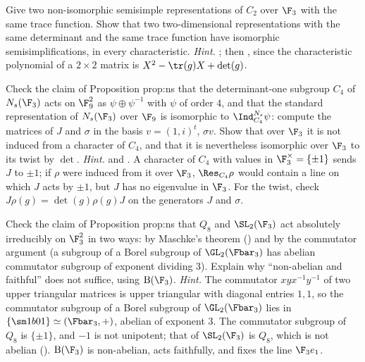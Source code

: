 \begin{exercise}\label{ex:reps:ex4}
Give two non-isomorphic semisimple representations of $C_2$ over $\F_3$ with the same trace function. Show that two two-dimensional
representations with the same determinant and the same trace function have isomorphic semisimplifications, in every characteristic.
\emph{Hint.} ; then , since the characteristic polynomial of a $2\times2$ matrix is
$X^2-\tr(g)X+\det(g)$.
\end{exercise}

\begin{exercise}\label{ex:reps:ex5}
Check the claim of Proposition prop:ns that the determinant-one subgroup $C_4$ of $N_s(\F_3)$ acts on $\F_9^2$ as $\psi\oplus\psi^{-1}$ with $\psi$ of order $4$, and
that the standard representation of $N_s(\F_3)$ over $\F_9$ is isomorphic to $\Ind_{C_4}^{N_s}\psi$: compute the matrices of $J$ and $\sigma$ in the basis
$v=(1,i)^t$, $\sigma v$. Show that over $\F_3$ it is not induced from a character of $C_4$, and that it is nevertheless isomorphic over $\F_3$ to its twist by $\det$.
\emph{Hint.}  and . A character of $C_4$ with values in $\F_3^\times=\{\pm1\}$ sends $J$ to $\pm1$; if $\rho$
were induced from it over $\F_3$, $\Res_{C_4}\rho$ would contain a line on which $J$ acts by $\pm1$, but $J$ has no eigenvalue in $\F_3$. For the
twist, check $J\rho(g)=\det(g)\rho(g)J$ on the generators $J$ and $\sigma$.
\end{exercise}

\begin{exercise}\label{ex:reps:ex6}
Check the claim of Proposition prop:ns that $Q_8$ and $\SL_2(\F_3)$ act absolutely irreducibly on $\F_3^2$ in two ways: by Maschke's theorem
() and by the commutator argument (a subgroup of a Borel subgroup of $\GL_2(\Fbar_3)$ has abelian commutator subgroup of
exponent dividing $3$). Explain why ``non-abelian and faithful'' does not suffice, using $\mathrm B(\F_3)$.
\emph{Hint.} The commutator $xyx^{-1}y^{-1}$ of two upper triangular matrices is upper triangular with diagonal entries $1,1$, so the
commutator subgroup of a Borel subgroup of $\GL_2(\Fbar_3)$ lies in $\{\sm1b01\}\simeq(\Fbar_3,+)$, abelian of exponent $3$. The commutator subgroup
of $Q_8$ is $\{\pm1\}$, and $-1$ is not unipotent; that of $\SL_2(\F_3)$ is $Q_8$, which is not abelian (). $\mathrm B(\F_3)$ is
non-abelian, acts faithfully, and fixes the line $\F_3e_1$.
\end{exercise}

